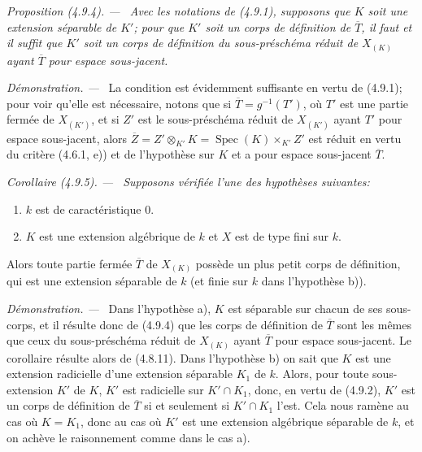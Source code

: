 \documentclass[10pt,oneside]{book}
\newenvironment{proposition}[1][]{%
  \par\medskip\noindent\itshape Proposition (#1). ---\ }{\par}
\newenvironment{corollary}[1][]{%
  \par\medskip\noindent\itshape Corollaire (#1). ---\ }{\par}
\newenvironment{proof}{%
  \par\medskip\noindent\textit{Démonstration. ---\ }}{\par}
\begin{document}
\begin{proposition}[4.9.4]
\label{IV.2.4.9.4-fr}
Avec les notations de (4.9.1), supposons que $K$ soit une extension séparable
de $K'$; pour que $K'$ soit un corps de définition de $\overline T$, il faut
et il suffit que $K'$ soit un corps de définition du sous-préschéma réduit de
$X_{(K)}$ ayant $\overline T$ pour espace sous-jacent.
\end{proposition}

\begin{proof}
La condition est évidemment suffisante en vertu de (4.9.1); pour voir qu'elle
est nécessaire, notons que si $\overline T=g^{-1}(T')$, où $T'$ est une
partie fermée de $X_{(K')}$, et si $Z'$ est le sous-préschéma réduit de
$X_{(K')}$ ayant $T'$ pour espace sous-jacent, alors
$\overline Z=Z'\otimes_{K'}K=\operatorname{Spec}(K)\times_{K'}Z'$ est réduit
en vertu du critère (4.6.1, e)) et de l'hypothèse sur $K$ et a pour espace
sous-jacent $\overline T$.
\end{proof}

\begin{corollary}[4.9.5]
\label{IV.2.4.9.5-fr}
Supposons vérifiée l'une des hypothèses suivantes:
\begin{enumerate}
\item[a)] $k$ est de caractéristique $0$.
\item[b)] $K$ est une extension algébrique de $k$ et $X$ est de type fini sur
$k$.
\end{enumerate}
Alors toute partie fermée $\overline T$ de $X_{(K)}$ possède un plus petit
corps de définition, qui est une extension séparable de $k$ (et finie sur $k$
dans l'hypothèse b)).
\end{corollary}

\begin{proof}
Dans l'hypothèse a), $K$ est séparable sur chacun de ses sous-corps, et il
résulte donc de (4.9.4) que les corps de définition de $\overline T$ sont les
mêmes que ceux du sous-préschéma réduit de $X_{(K)}$ ayant $\overline T$ pour
espace sous-jacent. Le corollaire résulte alors de (4.8.11). Dans l'hypothèse
b) on sait que $K$ est une extension radicielle d'une extension séparable
$K_1$ de $k$. Alors, pour toute sous-extension $K'$ de $K$, $K'$ est
radicielle sur $K'\cap K_1$, donc, en vertu de (4.9.2), $K'$ est un corps de
définition de $\overline T$ si et seulement si $K'\cap K_1$ l'est. Cela nous
ramène au cas où $K=K_1$, donc au cas où $K'$ est une extension algébrique
séparable de $k$, et on achève le raisonnement comme dans le cas a).
\end{proof}
\end{document}
